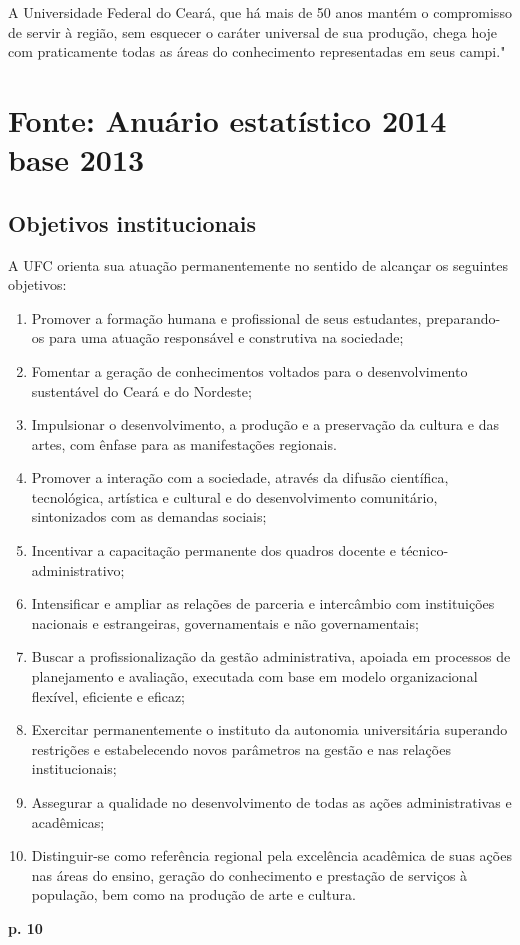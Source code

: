 \documentclass{report}
\begin{document}
A Universidade Federal do Ceará, que há mais de 50 anos mantém o compromisso de servir à região, sem esquecer o caráter universal de sua produção, chega hoje com praticamente todas as áreas do conhecimento representadas em seus campi." 

\section{Fonte: Anuário estatístico 2014 base 2013}

\cite{anuario_2014_base_2013}

\subsection{Objetivos institucionais}

A UFC orienta sua atuação permanentemente no sentido de alcançar os seguintes objetivos:
\begin{enumerate}
\item
Promover a formação humana e profissional de seus estudantes, preparando-os para uma atuação responsável e construtiva na sociedade;
\item
Fomentar a geração de conhecimentos voltados para o desenvolvimento sustentável do Ceará e do Nordeste;
\item
Impulsionar o desenvolvimento, a produção e a preservação da cultura e das artes, com ênfase para as manifestações regionais.
\item
Promover a interação com a sociedade, através da difusão científica, tecnológica, artística e cultural e do desenvolvimento comunitário, sintonizados com as demandas sociais;
\item
Incentivar a capacitação permanente dos quadros docente e técnico-administrativo;
\item
Intensificar e ampliar as relações de parceria e intercâmbio com instituições nacionais e estrangeiras, governamentais e não governamentais;
\item
Buscar a profissionalização da gestão administrativa, apoiada em processos de planejamento e avaliação, executada com base em modelo organizacional flexível, eficiente e eficaz;
\item
Exercitar permanentemente o instituto da autonomia universitária superando restrições e estabelecendo novos parâmetros na gestão e nas relações institucionais;
\item
Assegurar a qualidade no desenvolvimento de todas as ações administrativas e acadêmicas;
\item
Distinguir-se como referência regional pela excelência acadêmica de suas ações nas áreas do ensino, geração do conhecimento e prestação de serviços à população, bem como na produção de arte e cultura.
\end{enumerate}
\textbf{p. 10}
\end{document}
